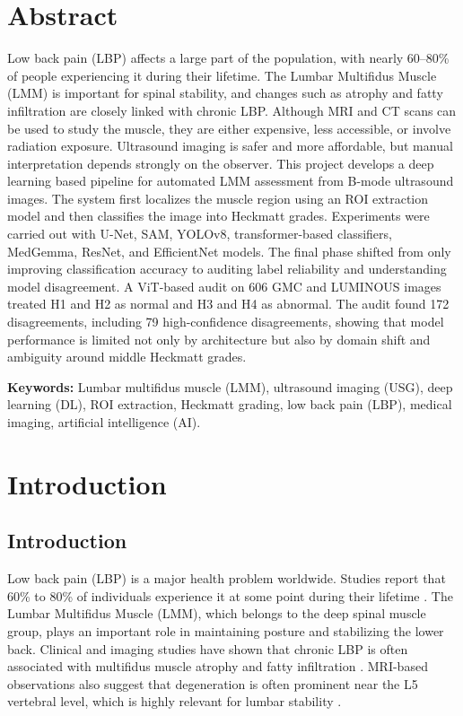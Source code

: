 ﻿\documentclass[12pt,a4paper]{report}
\begin{document}
\chapter*{Abstract}
Low back pain (LBP) affects a large part of the population, with nearly 60--80\% of people experiencing it during their lifetime. The Lumbar Multifidus Muscle (LMM) is important for spinal stability, and changes such as atrophy and fatty infiltration are closely linked with chronic LBP. Although MRI and CT scans can be used to study the muscle, they are either expensive, less accessible, or involve radiation exposure. Ultrasound imaging is safer and more affordable, but manual interpretation depends strongly on the observer. This project develops a deep learning based pipeline for automated LMM assessment from B-mode ultrasound images. The system first localizes the muscle region using an ROI extraction model and then classifies the image into Heckmatt grades. Experiments were carried out with U-Net, SAM, YOLOv8, transformer-based classifiers, MedGemma, ResNet, and EfficientNet models. The final phase shifted from only improving classification accuracy to auditing label reliability and understanding model disagreement. A ViT-based audit on 606 GMC and LUMINOUS images treated H1 and H2 as normal and H3 and H4 as abnormal. The audit found 172 disagreements, including 79 high-confidence disagreements, showing that model performance is limited not only by architecture but also by domain shift and ambiguity around middle Heckmatt grades.

\vspace{4mm}
\noindent\textbf{Keywords:} Lumbar multifidus muscle (LMM), ultrasound imaging (USG), deep learning (DL), ROI extraction, Heckmatt grading, low back pain (LBP), medical imaging, artificial intelligence (AI).

\tableofcontents
\listoftables
\listoffigures

\clearpage
{}
\chapter{Introduction}
\label{chap:introduction}
\section{Introduction}
\label{intro}
Low back pain (LBP) is a major health problem worldwide. Studies report that 60\% to 80\% of individuals experience it at some point during their lifetime \cite{Freeman2010}. The Lumbar Multifidus Muscle (LMM), which belongs to the deep spinal muscle group, plays an important role in maintaining posture and stabilizing the lower back. Clinical and imaging studies have shown that chronic LBP is often associated with multifidus muscle atrophy and fatty infiltration \cite{Vohra2016}. MRI-based observations also suggest that degeneration is often prominent near the L5 vertebral level, which is highly relevant for lumbar stability \cite{Vohra2016}.
\end{document}
